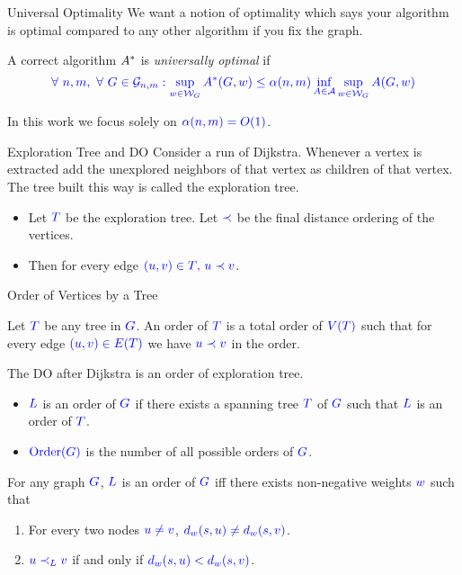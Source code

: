 \documentclass[10pt]{beamer}
\DeclareMathOperator{\order}{Order}
\begin{document}
\begin{frame}{Universal Optimality}
	We want a notion of optimality which says your algorithm is optimal compared to any other algorithm if you fix the graph.\pause  \vfill

	A correct algorithm $\mathcolor{blue}{}A^*$ is \emph{universally optimal} if$$\mathcolor{blue}{\forall\ n,m,\ \forall\ G\in \mathcal{G}_{n,m}: \sup\limits_{w\in \mathcal{W}_G} A^*(G,w)\leq \alpha(n,m)\inf\limits_{A\in \mathcal{A}}\sup\limits_{w\in \mathcal{W}_G} A(G,w)}$$\pause \vfill

	In this work we focus solely on  $\mathcolor{blue}{\alpha(n,m)=O(1)}$.
\end{frame}
\begin{frame}{Exploration Tree and DO}
	Consider a run of Dijkstra. Whenever a vertex is extracted add the unexplored neighbors of that vertex as children of that vertex. The tree built this way is called the exploration tree.\pause \vfill

	\begin{itemize}
		\item Let $\mathcolor{blue}{T}$ be the exploration tree. Let $\mathcolor{blue}{\prec}$ be the final distance ordering of the vertices.\pause \vfill
		\item Then for every edge $\mathcolor{blue}{(u,v)\in T$, $u\prec v}$.
	\end{itemize}
\end{frame}
\begin{frame}{Order of Vertices by a Tree}
	\begin{definition}[Order of $T$]
		Let $\mathcolor{blue}{T}$ be any tree in $\mathcolor{blue}{G}$. An order of $\mathcolor{blue}{T}$ is a total order of $\mathcolor{blue}{V(T)}$ such that for every edge $\mathcolor{blue}{(u,v)\in E(T)}$ we have $\mathcolor{blue}{u\prec v}$ in the order.
	\end{definition}\pause\vfill
	The DO after Dijkstra is an order of exploration tree.
	\begin{itemize}
		\item $\mathcolor{blue}{L}$ is an order of $\mathcolor{blue}{G}$ if there exists a spanning tree $\mathcolor{blue}{T}$ of $\mathcolor{blue}{G}$ such that $\mathcolor{blue}{L}$ is an order of $\mathcolor{blue}{T}$.\pause
		\item $\mathcolor{blue}{\order(G)}$ is the number of all possible orders of $\mathcolor{blue}{G}$.
	\end{itemize}\pause \vfill

	\begin{lemma}
		For any graph $\mathcolor{blue}{G}$, $\mathcolor{blue}{L}$ is an order of $\mathcolor{blue}{G}$ iff there exists non-negative weights $\mathcolor{blue}{w}$ such that \begin{enumerate}
			\item For every two nodes $\mathcolor{blue}{u\neq v}$, $\mathcolor{blue}{d_w(s,u)\neq d_w(s,v)}$.
			\item $\mathcolor{blue}{u\prec_L v}$ if and only if $\mathcolor{blue}{d_w(s,u)<d_w(s, v)}$.
		\end{enumerate}
	\end{lemma}
\end{frame}
\end{document}

